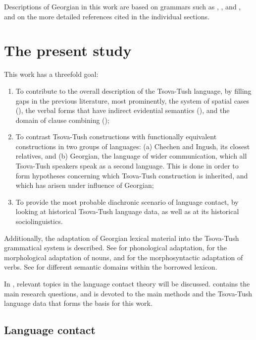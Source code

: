 Descriptions of Georgian in this work are based on grammars such as \textcite{hewitt95}, \textcite{vogt}, and \textcite{shanidze53sapudz}, and on the more detailed references cited in the individual sections.
\pagebreak
\section{The present study} \label{study}

This work has a threefold goal: 

\begin{enumerate} 
	\item To contribute to the overall description of the Tsova-Tush language, by filling gaps in the previous literature, most prominently, the system of spatial cases (), the verbal forms that have indirect evidential semantics (), and the domain of clause combining (); 
	\item To contrast Tsova-Tush constructions with functionally equivalent constructions in two groups of languages: (a) Chechen and Ingush, its closest relatives, and (b) Georgian, the language of wider communication, which all Tsova-Tush speakers speak as a second language. This is done in order to form hypotheses concerning which Tsova-Tush construction is inherited, and which has arisen under influence of Georgian; 
	\item To provide the most probable diachronic scenario of language contact, by looking at historical Tsova-Tush language data, as well as at its historical sociolinguistics. 
\end{enumerate}


Additionally, the adaptation of Georgian lexical material into the Tsova-Tush grammatical system is described. See  for phonological adaptation,  for the morphological adaptation of nouns, and  for the morphosyntactic adaptation of verbs. See  for different semantic domains within the borrowed lexicon.

In , relevant topics in the language contact theory will be discussed.  contains the main research questions, and  is devoted to the main methods and the Tsova-Tush language data that forms the basis for this work.

\subsection{Language contact} \label{theory}

